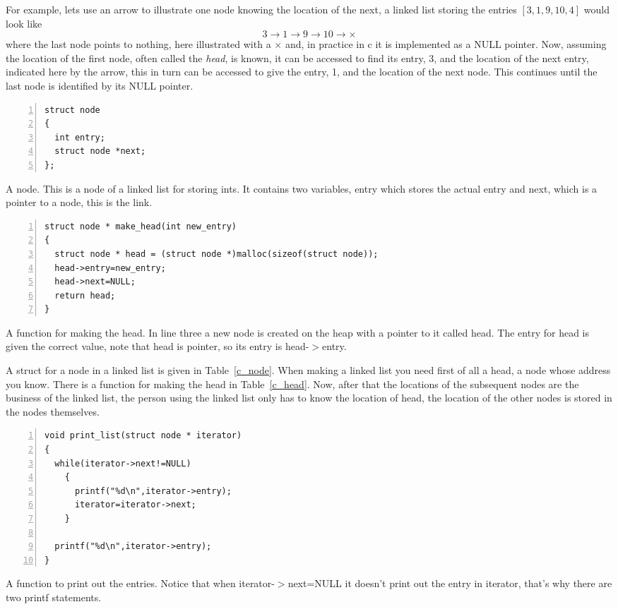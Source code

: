 \documentclass[11pt,a4paper]{scrartcl}
\begin{document}
For example, lets use an arrow to illustrate one node knowing the
location of the next, a linked list storing the entries $[3,1,9,10,4]$
would look like
\begin{equation}
3\rightarrow 1\rightarrow 9\rightarrow 10\rightarrow \times
\end{equation}
where the last node points to nothing, here illustrated with a
$\times$ and, in practice in c it is implemented as a NULL pointer. Now,
assuming the location of the first node, often called the \textsl{head},
is known, it can be accessed to find its entry, 3, and the location of
the next entry, indicated here by the arrow, this in turn can be
accessed to give the entry, 1, and the location of the next node. This
continues until the last node is identified by its NULL pointer. 

\begin{table}
\begin{lstlisting}[numbers=left]
struct node
{
  int entry;
  struct node *next;
};
\end{lstlisting}
\caption{A node. This is a node of a linked list for storing ints. It
  contains two variables, entry which stores the actual entry and
  next, which is a pointer to a node, this is the link. \label{c_node}}
\end{table}

\begin{table}
\begin{lstlisting}[numbers=left]
struct node * make_head(int new_entry)
{
  struct node * head = (struct node *)malloc(sizeof(struct node));
  head->entry=new_entry;
  head->next=NULL;
  return head;
}
\end{lstlisting}
\caption{A function for making the head. In line three a new node is
  created on the heap with a pointer to it called head. The entry for
  head is given the correct value, note that head is pointer, so its
  entry is head-$>$entry. \label{c_head}}
\end{table}


A struct for a node in a linked list is given in
Table~\ref{c_node}. When making a linked list you need first of all a
head, a node whose address you know. There is a function for making
the head in Table~\ref{c_head}. Now, after that the locations of the
subsequent nodes are the business of the linked list, the person using
the linked list only has to know the location of head, the location of
the other nodes is stored in the nodes themselves.


\begin{table}
\begin{lstlisting}[numbers=left]
void print_list(struct node * iterator)
{
  while(iterator->next!=NULL)
    {
      printf("%d\n",iterator->entry);
      iterator=iterator->next;
    }

  printf("%d\n",iterator->entry);
}
\end{lstlisting}
\caption{A function to print out the entries. Notice that when
  iterator-$>$next=NULL it doesn't print out the entry in iterator,
  that's why there are two printf statements.\label{c_print}}
\end{table}
\end{document}
